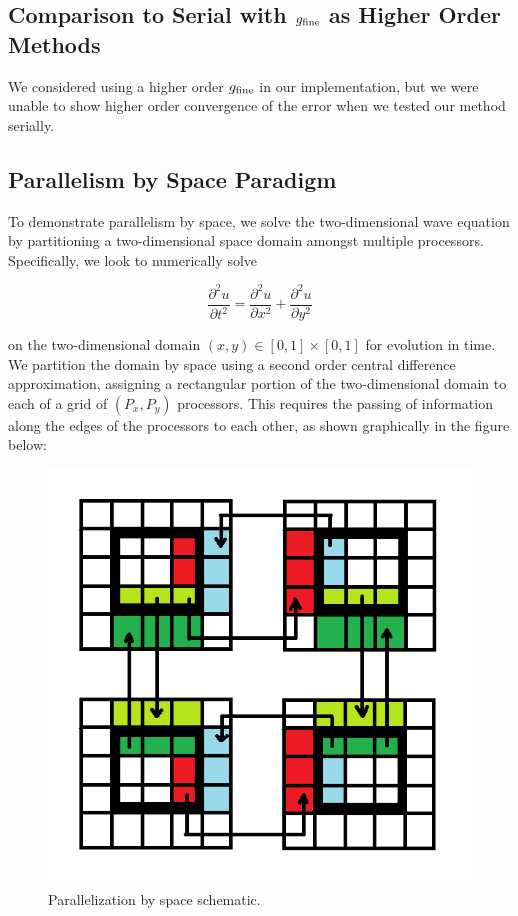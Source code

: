 \documentclass[letterpaper,12pt]{article}
\begin{document}
\subsection{Comparison to Serial with $g_{\textnormal{fine}}$ as Higher Order
Methods}

We considered using a higher order $g_{\textnormal{fine}}$ in our
implementation, but we were unable to show higher order convergence of the error
when we tested our method serially. 

\subsection{Parallelism by Space Paradigm}

To demonstrate parallelism by space, we solve the two-dimensional wave equation by partitioning a two-dimensional space domain amongst multiple processors. Specifically, we look to numerically solve

\begin{equation*}
\frac{\partial^2 u}{\partial t^2} = \frac{\partial^2 u}{\partial x^2} + \frac{\partial^2 u}{\partial y^2}
\end{equation*}

on the two-dimensional domain $(x, y) \in [0,1]\times[0,1]$ for evolution in time. We partition the domain by space using a second order central difference approximation, assigning a rectangular portion of the two-dimensional domain to each of a grid of $(P_x, P_y)$ processors. This requires the passing of information along the edges of the processors to each other, as shown graphically in the figure below:

\begin{figure}[H]
\begin{center}
\includegraphics[width=0.5\linewidth]{decomp.png}
\caption{Parallelization by space schematic.}
\label{fig:spaceparallel}
\end{center}
\end{figure}
\end{document}
